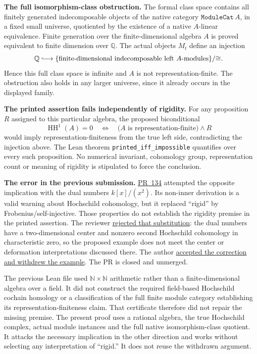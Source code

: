 \documentclass[10pt]{article}
\newcommand{\Q}{\mathbb Q}
\newcommand{\HH}{\operatorname{HH}}
\begin{document}
\textbf{The full isomorphism-class obstruction.}
The formal class space contains all finitely generated indecomposable objects
of the native category $\texttt{ModuleCat}\,A$, in a fixed small universe,
quotiented by the existence of a native $A$-linear equivalence. Finite generation
over the finite-dimensional algebra $A$ is proved equivalent to finite
dimension over $\Q$. The actual objects $M_t$ define an injection
\[
 \Q\lhook\joinrel\longrightarrow
 \{\text{finite-dimensional indecomposable left }A\text{-modules}\}/{\cong}.
\]
Hence this full class space is infinite and $A$ is not representation-finite.
The obstruction also holds in any larger universe, since it already occurs
in the displayed family.

\textbf{The printed assertion fails independently of rigidity.}
For any proposition $R$ assigned to this particular algebra, the proposed
biconditional
\[
 \HH^1(A)=0\quad\Longleftrightarrow\quad
 \bigl(A\text{ is representation-finite}\bigr)\land R
\]
would imply representation-finiteness from the true left side, contradicting
the injection above. The Lean theorem \texttt{printed\_iff\_impossible}
quantifies over every such proposition. No numerical invariant, cohomology
group, representation count or meaning of rigidity is stipulated to force
the conclusion.

\newpage
\textbf{The error in the previous submission.}
\href{https://github.com/The-Last-Math-Competition/The-Last-Math-Competition/pull/134}{PR~134}
attempted the opposite implication with the dual numbers $k[x]/(x^2)$.
Its non-inner derivation is a valid warning about Hochschild cohomology, but
it replaced ``rigid'' by Frobenius/self-injective. Those properties do not
establish the rigidity premise in the printed assertion. The reviewer
\href{https://github.com/The-Last-Math-Competition/The-Last-Math-Competition/pull/134#issuecomment-5942503126}{rejected that substitution}:
the dual numbers have a two-dimensional center and nonzero second Hochschild
cohomology in characteristic zero, so the proposed example does not meet
the center or deformation interpretations discussed there. The author
\href{https://github.com/The-Last-Math-Competition/The-Last-Math-Competition/pull/134#issuecomment-5945753401}{accepted the correction and withdrew the example}.
The PR is closed and unmerged.

The previous Lean file used $\mathbb N\times\mathbb N$ arithmetic rather than
a finite-dimensional algebra over a field. It did not construct the required
field-based Hochschild cochain homology or a classification of the full
finite module category establishing its representation-finiteness claim.
That certificate therefore did not repair the missing premise. The present
proof uses a rational algebra, the true Hochschild complex, actual module
instances and the full native isomorphism-class quotient. It attacks the
necessary implication in the other direction and works without selecting
any interpretation of ``rigid.'' It does not reuse the withdrawn argument.
\end{document}
